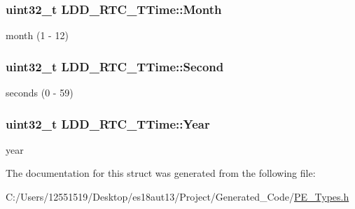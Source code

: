 \subsubsection[{Month}]{\setlength{\rightskip}{0pt plus 5cm}uint32\+\_\+t L\+D\+D\+\_\+\+R\+T\+C\+\_\+\+T\+Time\+::\+Month}\label{struct_l_d_d___r_t_c___t_time_a2de1da3c8e42665975c2469125b04dfd}
month (1 -\/ 12) \hypertarget{struct_l_d_d___r_t_c___t_time_ab6c770706c18542e856d56398850ac9e}{}
\subsubsection[{Second}]{\setlength{\rightskip}{0pt plus 5cm}uint32\+\_\+t L\+D\+D\+\_\+\+R\+T\+C\+\_\+\+T\+Time\+::\+Second}\label{struct_l_d_d___r_t_c___t_time_ab6c770706c18542e856d56398850ac9e}
seconds (0 -\/ 59) \hypertarget{struct_l_d_d___r_t_c___t_time_a16fbfb74b239e4b5e1889fe19d025d5e}{}
\subsubsection[{Year}]{\setlength{\rightskip}{0pt plus 5cm}uint32\+\_\+t L\+D\+D\+\_\+\+R\+T\+C\+\_\+\+T\+Time\+::\+Year}\label{struct_l_d_d___r_t_c___t_time_a16fbfb74b239e4b5e1889fe19d025d5e}
year 

The documentation for this struct was generated from the following file\+:\begin{DoxyCompactItemize}
\item 
C\+:/\+Users/12551519/\+Desktop/es18aut13/\+Project/\+Generated\+\_\+\+Code/\hyperlink{_p_e___types_8h}{P\+E\+\_\+\+Types.\+h}\end{DoxyCompactItemize}
